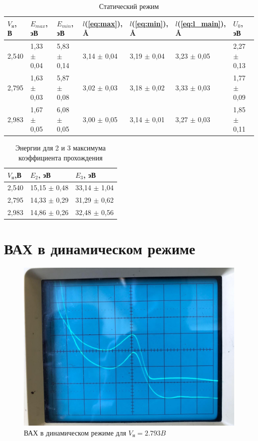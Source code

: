 \documentclass[reprint, nofootinbib, nobalancelastpage, 10pt]{revtex4-2}
\begin{document}
\begin{table}[h!]
	\caption{Статический режим}
	\label{tab:2}
	\begin{tabular}{|p{2cm}|p{2cm}|p{2cm}|p{2cm}|p{2cm}|p{2cm}|p{2cm}|}
		\hline
		$V_{\text{н}}$, В     & $E_{max}$,  эВ        & $E_{min}$,  эВ        &  $l$(\ref{eq:max}), \AA{} & $l$(\ref{eq:min}), \AA{} & $l$(\ref{eq:l_main}), \AA{}        &  $U_0$, эВ         \\ \hline
		2,540 & 1,33 $\pm$  0,04 & 5,83 $\pm$ 0,14 & 3,14 $\pm$ 0,04 & 3,19 $\pm$ 0,04 & 3,23 $\pm$ 0,05 & 2,27 $\pm$ 0,13  \\ \hline
		2,795 & 1,63 $\pm$ 0,03   & 5,87 $\pm$ 0,08 & 3,02 $\pm$ 0,03 & 3,18 $\pm$ 0,02 & 3,33 $\pm$ 0,03   & 1,77 $\pm$ 0,09 \\ \hline
		2,983 & 1,67 $\pm$ 0,05   & 6,08 $\pm$ 0,05 & 3,00 $\pm$ 0,05 & 3,14 $\pm$ 0,01 & 3,27 $\pm$ 0,03   & 1,85 $\pm$ 0,11 \\ \hline
	\end{tabular}
\end{table}

\begin{table}[h!]
	\caption{Энергии для 2 и 3 максимума коэффициента прохождения}
	\label{tab:3}
	\begin{tabular}{|p{2cm}|p{2cm}|p{2cm}|}
		\hline
		$V_{\text{н}}$,В & $E_2$, эВ & $E_3$, эВ    \\ \hline
		2,540 & 15,15 $\pm$ 0,48 & 33,14 $\pm$ 1,04 \\ \hline
		2,795 & 14,33 $\pm$ 0,29 & 31,29 $\pm$ 0,62 \\ \hline
		2,983 & 14,86 $\pm$ 0,26 & 32,48 $\pm$ 0,56 \\ \hline
	\end{tabular}
\end{table}

\section{ВАХ в динамическом режиме}

\twocolumngrid

\begin{figure}[h!]
	\includegraphics[width = \linewidth]{vah1.jpg}
	\caption{ВАХ в динамическом режиме для $V_{\text{н}} = 2.793 B$}
	\label{graph:dinvah1}
\end{figure}
\end{document}
